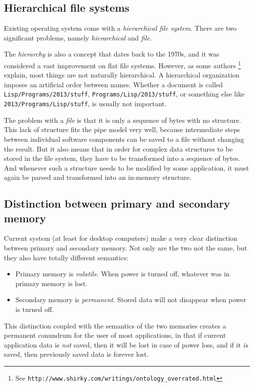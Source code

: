 \subsection{Hierarchical file systems}

Existing operating system come with a \emph{hierarchical file
system}.  There are two significant problems,
namely \emph{hierarchical} and \emph{file}.

The \emph{ hierarchy} is also a concept that dates back to the
1970s, and it was considered a vast improvement on flat file
systems.  However, as some authors%
\footnote{See
  \texttt{http://www.shirky.com/writings/ontology\_overrated.html}}
explain, most things are not naturally hierarchical.  A hierarchical
organization imposes an artificial order between names.  Whether a
document is called \texttt{Lisp/Programs/2013/stuff},
\texttt{Programs/Lisp/2013/stuff}, or something else like
\texttt{2013/Programs/Lisp/stuff}, is usually not important.

The problem with a \emph{file} is that it is only a sequence of
bytes with no structure.  This lack of structure fits the \unix{} pipe
model very well, because intermediate steps between individual
software components can be saved to a file without changing the
result.  But it also means that in order for complex data structures
to be stored in the file system, they have to be transformed into a
sequence of bytes.  And whenever such a structure needs to be
modified by some application, it must again be parsed and
transformed into an in-memory structure.

\subsection{Distinction between primary and secondary memory}

Current system (at least for desktop computers) make a very clear
distinction between primary and secondary memory.  Not only are the
two not the same, but they also have totally different semantics:
\begin{itemize}
\item Primary memory is \emph{volatile}.  When power is turned off,
    whatever was in primary memory is lost.
    \item Secondary memory is \emph{permanent}.  Stored data will not
    disappear when power is turned off.
\end{itemize}

This distinction coupled with the semantics of the two memories
creates a permanent conundrum for the user of most applications, in
that if current application data is \emph{not} saved, then it will
be lost in case of power loss, and if it \emph{is} saved, then
previously saved data is forever lost. 

